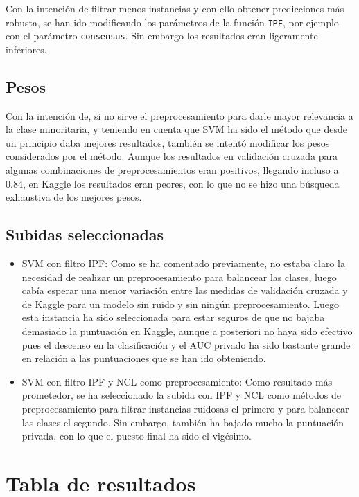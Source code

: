 \documentclass[11pt]{article}
\begin{document}
Con la intención de filtrar menos instancias y con ello obtener
predicciones más robusta, se han ido modificando los parámetros de la
función \texttt{IPF}, por ejemplo con el parámetro \texttt{consensus}. Sin embargo
los resultados eran ligeramente inferiores. 


\subsection{Pesos}
\label{sec:orga75bfc5}

Con la intención de, si no sirve el preprocesamiento para darle mayor
relevancia a la clase minoritaria, y teniendo en cuenta que SVM ha
sido el método que desde un principio daba mejores resultados, también
se intentó modificar los pesos considerados por el método. Aunque los
resultados en validación cruzada para algunas combinaciones de
preprocesamientos eran positivos, llegando incluso a 0.84, en Kaggle
los resultados eran peores, con lo que no se hizo una búsqueda
exhaustiva de los mejores pesos.


\subsection{Subidas seleccionadas}
\label{sec:orgb3ce95c}

\begin{itemize}
\item SVM con filtro IPF: Como se ha comentado previamente, no estaba
claro la necesidad de realizar un preprocesamiento para balancear
las clases, luego cabía esperar una menor variación entre las
medidas de validación cruzada y de Kaggle para un modelo sin ruido y
sin ningún preprocesamiento. Luego esta instancia ha sido
seleccionada para estar seguros de que no bajaba demasiado la
puntuación en Kaggle, aunque a posteriori no haya sido efectivo pues
el descenso en la clasificación y el AUC privado ha sido bastante
grande en relación a las puntuaciones que se han ido obteniendo.

\item SVM con filtro IPF y NCL como preprocesamiento: Como resultado más
prometedor, se ha seleccionado la subida con IPF y NCL como métodos
de preprocesamiento para filtrar instancias ruidosas el primero y
para balancear las clases el segundo. Sin embargo, también ha bajado
mucho la puntuación privada, con lo que el puesto final ha sido el
vigésimo.
\end{itemize}


\section{Tabla de resultados}
\label{sec:orgfa50634}
\end{document}
